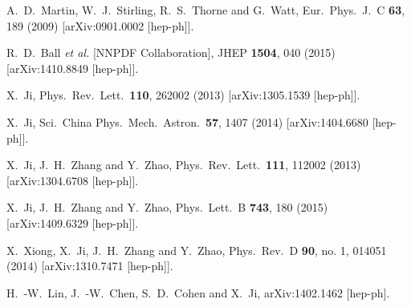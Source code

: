 \documentclass[english,preprint,aps,prd,showpacs,superscriptaddress,nofootinbib,tightenlines]{revtex4}
\begin{document}
\begin{thebibliography}{99}
  A.~D.~Martin, W.~J.~Stirling, R.~S.~Thorne and G.~Watt,
  Eur.\ Phys.\ J.\ C {\bf 63}, 189 (2009)
  [arXiv:0901.0002 [hep-ph]].

  R.~D.~Ball {\it et al.} [NNPDF Collaboration],
  JHEP {\bf 1504}, 040 (2015)
  [arXiv:1410.8849 [hep-ph]].

X.~Ji,
Phys.\ Rev.\ Lett.\  {\bf 110}, 262002 (2013) [arXiv:1305.1539 [hep-ph]].

  X.~Ji,
  Sci.\ China Phys.\ Mech.\ Astron.\  {\bf 57}, 1407 (2014)  [arXiv:1404.6680 [hep-ph]].


X.~Ji, J.~H.~Zhang and Y.~Zhao,
Phys.\ Rev.\ Lett.\  {\bf 111}, 112002 (2013) [arXiv:1304.6708 [hep-ph]].

X.~Ji, J.~H.~Zhang and Y.~Zhao,
Phys.\ Lett.\ B {\bf 743}, 180 (2015)
[arXiv:1409.6329 [hep-ph]].

X.~Xiong, X.~Ji, J.~H.~Zhang and Y.~Zhao,
Phys.\ Rev.\ D {\bf 90}, no. 1, 014051 (2014)   [arXiv:1310.7471 [hep-ph]].




H.~-W.~Lin, J.~-W.~Chen, S.~D.~Cohen and X.~Ji,
arXiv:1402.1462 [hep-ph].


\end{thebibliography}
\end{document}
